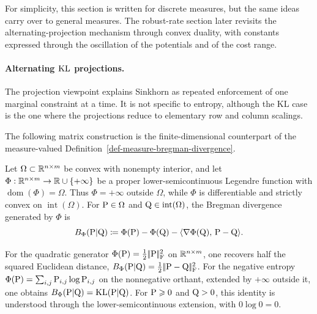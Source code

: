 For simplicity, this section is written for discrete measures, but the same ideas carry over to general measures. The robust-rate section later revisits the alternating-projection mechanism through convex duality, with constants expressed through the oscillation of the potentials and of the cost range.

\paragraph{Alternating $\KL$ projections.}

The projection viewpoint explains Sinkhorn as repeated enforcement of one marginal constraint at a time. It is not specific to entropy, although the KL case is the one where the projections reduce to elementary row and column scalings.

The following matrix construction is the finite-dimensional counterpart of the measure-valued Definition~\ref{def-measure-bregman-divergence}.

\begin{defn}\label{def-bregman-divergence}
	Let $\Omega\subset\RR^{n\times m}$ be convex with nonempty interior, and let $\Phi:\RR^{n\times m}\to\RR\cup\{+\infty\}$ be a proper lower-semicontinuous Legendre function with $\operatorname{dom}(\Phi)=\Omega$. Thus $\Phi=+\infty$ outside $\Omega$, while $\Phi$ is differentiable and strictly convex on $\operatorname{int}(\Omega)$. For $\P\in\Omega$ and $\Q\in\operatorname{int}(\Omega)$, the Bregman divergence generated by $\Phi$ is
	\[
		B_\Phi(\P|\Q)\eqdef \Phi(\P)-\Phi(\Q)-\dotp{\nabla\Phi(\Q)}{\P-\Q}.
	\]
\end{defn}

For the quadratic generator $\Phi(\P)=\frac12\norm{\P}_{\mathrm F}^2$ on $\RR^{n\times m}$, one recovers half the squared Euclidean distance, $B_\Phi(\P|\Q)=\frac12\norm{\P-\Q}_{\mathrm F}^2$. For the negative entropy $\Phi(\P)=\sum_{i,j}\P_{i,j}\log \P_{i,j}$ on the nonnegative orthant, extended by $+\infty$ outside it, one obtains $B_\Phi(\P|\Q)=\KLD(\P|\Q)$. For $\P\geq0$ and $\Q>0$, this identity is understood through the lower-semicontinuous extension, with $0\log0=0$.

